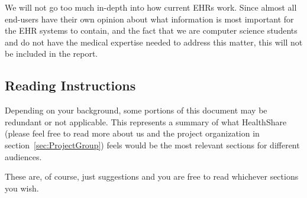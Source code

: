 \documentclass[14pt]{article}
\begin{document}
We will not go too much in-depth into how current EHRs work. Since almost all end-users have their own opinion about what information is most important for the EHR systems to contain, and the fact that we are computer science students and do not have the medical expertise needed to address this matter, this will not be included in the report.



\subsection{Reading Instructions}
Depending on your background, some portions of this document may be redundant or not applicable. This represents a summary of what HealthShare (please feel free to read more about us and the project organization in section~\ref{sec:ProjectGroup}) feels would be the most relevant sections for different audiences.

These are, of course, just suggestions and you are free to read whichever sections you wish.
\end{document}
